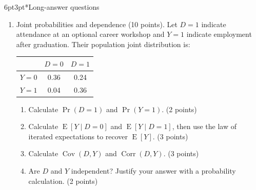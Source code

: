 \documentclass[a4paper,11pt,twoside]{article}
\makeatletter
\newcommand{\E}{\operatorname{E}}
\newcommand{\Cov}{\operatorname{Cov}}
\newcommand{\Corr}{\operatorname{Corr}}
\renewcommand{\section}{\@startsection{section}{1}{\z@}%
  {6pt}{3pt}{\normalfont\bfseries\fontsize{12}{14}\selectfont}}
\makeatother
\begin{document}
\section*{Long-answer questions}
\begin{enumerate}[label=\arabic*.,leftmargin=*,itemsep=5pt,topsep=4pt,parsep=0pt,start=9]
\Needspace{6.5cm}
\item Joint probabilities and dependence (10 points).
Let $D=1$ indicate attendance at an optional career workshop and $Y=1$ indicate
employment after graduation. Their population joint distribution is:
\begin{center}
\begin{tabular}{c|cc}
 & $D=0$ & $D=1$ \\ \hline
$Y=0$ & 0.36 & 0.24 \\
$Y=1$ & 0.04 & 0.36
\end{tabular}
\end{center}
\begin{enumerate}[label=(\alph*),leftmargin=*,itemsep=2pt,topsep=2pt]
\item Calculate $\Pr(D=1)$ and $\Pr(Y=1)$. (2 points)
\item Calculate $\E[Y\mid D=0]$ and $\E[Y\mid D=1]$, then use the law of
iterated expectations to recover $\E[Y]$. (3 points)
\item Calculate $\Cov(D,Y)$ and $\Corr(D,Y)$. (3 points)
\item Are $D$ and $Y$ independent? Justify your answer with a probability
calculation. (2 points)
\end{enumerate}


\end{enumerate}
\end{document}
